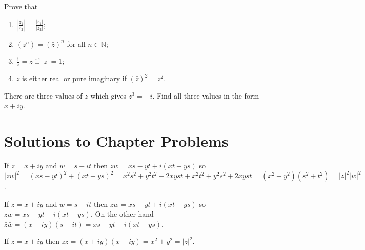 \begin{problem}
\label{2009_a10_2}
Prove that
\begin{enumerate}

\item $\displaystyle \left|\frac{z_1}{z_2}\right| = \frac{|z_1|}{|z_2|}$;
\item $\overline{(z^n)} = (\bar{z})^n$ for all $n \in \mathbb{N}$;
\item $\displaystyle \frac{1}{z} = \bar{z}$ if $|z| = 1$;
\item $z$ is either real or pure imaginary if $(\bar{z})^2 = z^2$.

\end{enumerate}
\end{problem}

\begin{problem}
\label{2009_a10_3}
There are three values of $z$ which gives $z^3 = -i$. Find all three values in the form $x + iy$.
\end{problem}

\section{Solutions to Chapter Problems} 

\vspace{2mm}
If $z=x+iy$ and $w=s+it$ then $zw=xs-yt +i(xt+ys)$ so $|zw|^2= (xs-yt)^2+(xt+ys)^2
=x^2s^2+y^2t^2-2xyst + x^2t^2+y^2s^2+2xyst=(x^2+y^2)(s^2+t^2)=|z|^2|w|^2$.

\vspace{2mm}
If $z=x+iy$ and $w=s+it$ then $zw=xs-yt +i(xt+ys)$ so $\overline{zw}=xs-yt -i(xt+ys)$.
On the other hand $\bar z \bar w=(x-iy)(s-it)=xs-yt -i(xt+ys)$.

\vspace{2mm}
If $z=x+iy$ then $z\bar z = (x+iy)(x-iy)=x^2+y^2=|z|^2$.

